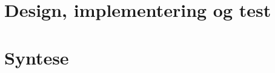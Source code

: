 \chapter{Design, implementering og test}\vspace{-.75cm}












\chapter{Syntese}






\begingroup
\raggedright


\endgroup

\begin{appendices}
	
\end{appendices}


